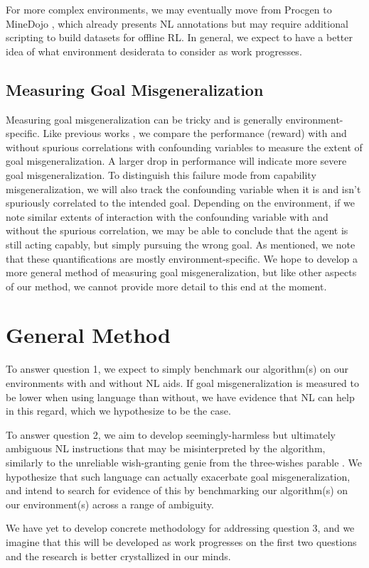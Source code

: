 \documentclass[../thesis-proposal/main.tex]{subfiles}
\begin{document}
For more complex environments, we may eventually move from Procgen to MineDojo
\citep{fan_minedojo_2022}, which already presents NL annotations but may require additional
scripting to build datasets for offline RL. In general, we expect to have a better idea of what
environment desiderata to consider as work progresses.

\subsection{Measuring Goal Misgeneralization}

Measuring goal misgeneralization can be tricky and is generally environment-specific. Like previous
works \citep{langosco_goal_2022, shah_benefits_2021, de_haan_causal_2019}, we compare the
performance (reward) with and without spurious correlations with confounding variables to measure
the extent of goal misgeneralization. A larger drop in performance will indicate more severe goal
misgeneralization. To distinguish this failure mode from capability misgeneralization, we will also
track the confounding variable when it is and isn't spuriously correlated to the intended goal.
Depending on the environment, if we note similar extents of interaction with the confounding
variable with and without the spurious correlation, we may be able to conclude that the agent is
still acting capably, but simply pursuing the wrong goal. As mentioned, we note that these
quantifications are mostly environment-specific. We hope to develop a more general method of
measuring goal misgeneralization, but like other aspects of our method, we cannot provide more
detail to this end at the moment.

\section{General Method}

To answer question 1, we expect to simply benchmark our algorithm(s) on our environments with and
without NL aids. If goal misgeneralization is measured to be lower when using language
than without, we have evidence that NL can help in this regard, which we hypothesize
to be the case.

To answer question 2, we aim to develop seemingly-harmless but ultimately ambiguous NL
instructions that may be misinterpreted by the algorithm, similarly to the unreliable wish-granting
genie from the three-wishes parable \citep{perrault_les_1865, galland_les_1717}. We hypothesize that
such language can actually exacerbate goal misgeneralization, and intend to search for evidence of
this by benchmarking our algorithm(s) on our environment(s) across a range of ambiguity.

We have yet to develop concrete methodology for addressing question 3, and we imagine that this will
be developed as work progresses on the first two questions and the research is better crystallized
in our minds.


\ifSubfilesClassLoaded{%
	
}{}
\end{document}
